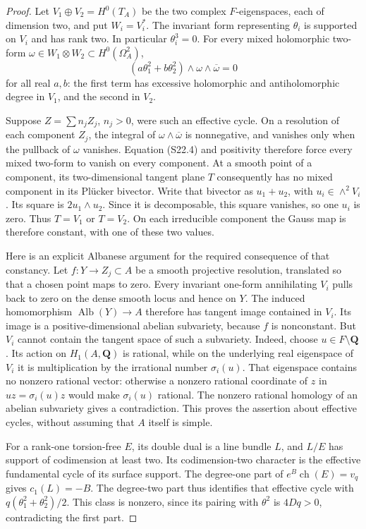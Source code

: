 \documentclass[11pt,a4paper]{article}
\theoremstyle{definition}
\begin{document}
\begin{proof}
Let $V_1\oplus V_2=H^0(T_A)$ be the two complex
$F$-eigenspaces, each of dimension two, and put
$W_i=V_i^*$. The invariant form representing $\theta_i$
is supported on $V_i$ and has rank two. In particular
$\theta_i^3=0$.
For every mixed holomorphic two-form
$\omega\in W_1\otimes W_2\subset H^0(\Omega_A^2)$,
\[
 (a\theta_1^2+b\theta_2^2)\wedge\omega\wedge\overline\omega=0
 \tag{S22.4}
\]
for all real $a,b$: the first term has excessive holomorphic
and antiholomorphic degree in $V_1$, and the second in $V_2$.

Suppose $Z=\sum n_jZ_j$, $n_j>0$, were such an effective
cycle. On a resolution of each component $Z_j$, the integral
of $\omega\wedge\overline\omega$ is nonnegative, and vanishes
only when the pullback of $\omega$ vanishes. Equation
(S22.4) and positivity therefore force every mixed two-form
to vanish on every component. At a smooth point of a
component, its two-dimensional tangent plane $T$ consequently
has no mixed component in its Pl\"ucker bivector.
Write that bivector as $u_1+u_2$, with
$u_i\in\wedge^2V_i$. Its square is $2u_1\wedge u_2$.
Since it is decomposable, this square vanishes, so one
$u_i$ is zero. Thus $T=V_1$ or $T=V_2$.
On each irreducible component the Gauss map is therefore
constant, with one of these two values.

Here is an explicit Albanese argument for the required
consequence of that constancy. Let $f:Y\to Z_j\subset A$
be a smooth projective resolution, translated so that a
chosen point maps to zero. Every invariant one-form
annihilating $V_i$ pulls back to zero on the dense smooth
locus and hence on $Y$. The induced homomorphism
$\operatorname{Alb}(Y)\to A$ therefore has tangent image
contained in $V_i$. Its image is a positive-dimensional
abelian subvariety, because $f$ is nonconstant. But $V_i$
cannot contain the tangent space of such a subvariety.
Indeed, choose $u\in F\setminus\mathbf Q$. Its action on
$H_1(A,\mathbf Q)$ is rational, while on the underlying
real eigenspace of $V_i$ it is multiplication by the
irrational number $\sigma_i(u)$. That eigenspace contains
no nonzero rational vector: otherwise a nonzero rational
coordinate of $z$ in $uz=\sigma_i(u)z$ would make
$\sigma_i(u)$ rational. The nonzero rational homology of
an abelian subvariety gives a contradiction.
This proves the assertion about effective cycles, without
assuming that $A$ itself is simple.

For a rank-one torsion-free $E$, its double dual is a line
bundle $L$, and $L/E$ has support of codimension at least
two. Its codimension-two character is the effective
fundamental cycle of its surface support. The degree-one
part of $e^B\operatorname{ch}(E)=v_q$ gives
$c_1(L)=-B$. The degree-two part thus identifies that
effective cycle with
$q(\theta_1^2+\theta_2^2)/2$.
This class is nonzero, since its pairing with $\theta^2$
is $4Dq>0$, contradicting the first part.


\end{proof}
\end{document}
